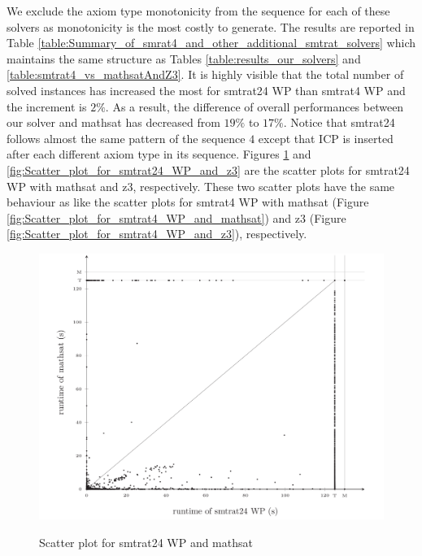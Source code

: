 \noindent We exclude the axiom type monotonicity from the sequence for each of these solvers as monotonicity is the most costly to generate.
The results are reported in Table \ref{table:Summary_of_smrat4_and_other_additional_smtrat_solvers} which maintains the same structure as Tables \ref{table:results_our_solvers} and \ref{table:smtrat4_vs_mathsatAndZ3}.
It is highly visible that the total number of solved instances has increased the most for smtrat24 WP than smtrat4 WP and the increment is $2\%$.
As a result, the difference of overall performances between our solver and mathsat has decreased from $19\%$ to $17\%$.
Notice that smtrat24 follows almost the same pattern of the sequence $4$ except that ICP is inserted after each different axiom type in its sequence.
Figures \ref{fig:Scatter_plot_for_smtrat24_WP_and_mathsat} and \ref{fig:Scatter_plot_for_smtrat24_WP_and_z3} are the scatter plots for smtrat24 WP with mathsat and z3, respectively.
These two scatter plots have the same behaviour as like the scatter plots for smtrat4 WP with mathsat (Figure \ref{fig:Scatter_plot_for_smtrat4_WP_and_mathsat}) and z3 (Figure \ref{fig:Scatter_plot_for_smtrat4_WP_and_z3}), respectively.\newline

\begin{figure}[]
    \centering
    \caption{Scatter plot for smtrat24 WP and mathsat}
    \includegraphics[width=1\linewidth]{./figures/scatter-smtrat_24_preprocessing-mathsat.pdf}
  \label{fig:Scatter_plot_for_smtrat24_WP_and_mathsat}
\end{figure}


